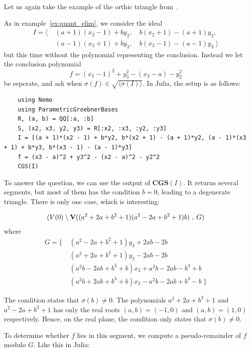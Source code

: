 Let us again take the example of the orthic triangle from~\cite{MONTES20101391}.


\begin{example} \upshape
  As in example~\ref{ex:quant_elim}, we consider the ideal
  \begin{align*}
    I = \langle\; &(a + 1)(x_{2} - 1) + b y_{2}, \quad  b(x_{2} + 1) - (a + 1)y_{2}, \\
                  &(a - 1)(x_{3} + 1) + b y_{3}, \quad  b(x_{3} - 1) - (a - 1)y_{3} \; \rangle
  \end{align*}
  but this time without the polynomial representing the conclusion. Instead we let the conclusion polynomial
  \[f = (x_{3} - 1)^{2} + y_{3}^{2} - (x_{2} - a) - y_{2}^{2}\]
  be seperate, and ask when $\sigma(f) \in \sqrt{\langle \sigma(I) \rangle}$. In Julia, the setup is as follows:

  \begin{verbatim}
    using Nemo
    using ParametricGroebnerBases
    R, (a, b) = QQ[:a, :b]
    S, (x2, x3, y2, y3) = R[:x2, :x3, :y2, :y3]
    I = [(a + 1)*(x2 - 1) + b*y2, b*(x2 + 1) - (a + 1)*y2, (a - 1)*(x3 + 1) + b*y3, b*(x3 - 1) - (a - 1)*y3]
    f = (x3 - a)^2 + y3^2 - (x2 - a)^2 - y2^2
    CGS(I)
  \end{verbatim}

  To answer the question, we can use the output of $\mathbf{CGS}(I)$. It returns several segments, but most of them has the condition $b = 0$, leading to a degenerate triangle. There is only one case, which is interesting:

  \[(V(0) \setminus \operatorname{\mathbf V}((a^{2} + 2a + b^{2} + 1)(a^{2} - 2a + b^{2} + 1)b)\;, \; G )\] where
  \begin{align*}
 G = \{\; &(a^2 - 2a + b^2 + 1)y_3 + 2ab - 2b \\
          &(a^2 + 2a + b^2 + 1)y_2 - 2ab - 2b \\
          &(a^2b - 2ab + b^3 + b)x_3 + a^2b - 2ab - b^3 + b \\
          &(a^2b + 2ab + b^3 + b)x_2 - a^2b - 2ab + b^3 - b \; \}
  \end{align*}

  The condition states that $\sigma(b) \neq 0$. The polynomials $a^{2} + 2a + b^{2} + 1$ and $a^{2} - 2a + b^{2} + 1$ has only the real roots $(a, b) = (-1, 0)$ and $(a, b) = (1, 0)$ respectively. Hence, on the real plane, the condition only states that $\sigma(b) \neq 0$.

  To determine whether $f$ lies in this segment, we compute a pseudo-remainder of $f$ modulo $G$. Like this in Julia:


\end{example}

